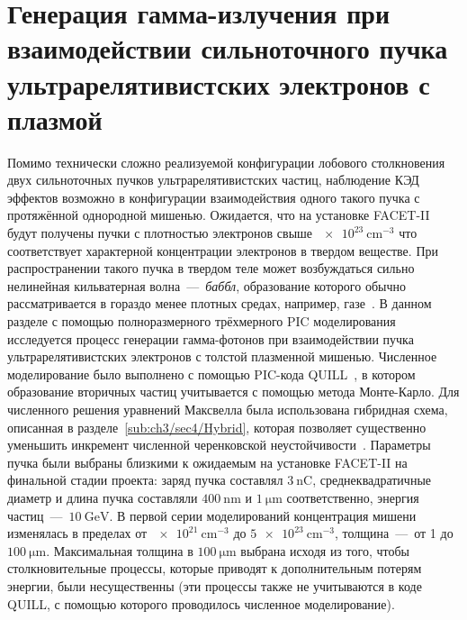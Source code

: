 \section{Генерация гамма-излучения при взаимодействии сильноточного пучка ультрарелятивистских электронов с плазмой}
\label{sec:ch3/sec5}

Помимо технически сложно реализуемой конфигурации лобового столкновения двух сильноточных пучков ультрарелятивистских частиц, наблюдение КЭД эффектов возможно в конфигурации взаимодействия одного такого пучка с протяжённой однородной мишенью. 
Ожидается, что на установке FACET-II будут получены пучки с плотностью электронов свыше $\SI{e23}{\centi\meter^{-3}}$ что соответствует характерной концентрации электронов в твердом веществе.
При распространении такого пучка в твердом теле может возбуждаться сильно нелинейная кильватерная волна~---~\textit{баббл}, образование которого обычно рассматривается в гораздо менее плотных средах, например, газе~\cite{rosenzweig1991acceleration, pukhov2002laser}.
В данном разделе с помощью полноразмерного трёхмерного PIC моделирования исследуется процесс генерации гамма-фотонов при взаимодействии пучка ультрарелятивистских электронов с толстой плазменной мишенью.
Численное моделирование было выполнено с помощью PIC-кода QUILL~\cite{QUILL}, в котором образование вторичных частиц учитывается с помощью метода Монте-Карло.
Для численного решения уравнений Максвелла была использована гибридная схема, описанная в разделе~\ref{sub:ch3/sec4/Hybrid}, которая позволяет существенно уменьшить инкремент численной черенковской неустойчивости~\cite{Birdsall1989, Meyers2014, Blinne2017}.
Параметры пучка были выбраны близкими к ожидаемым на установке FACET-II на финальной стадии проекта: заряд пучка составлял $\SI{3}{\nano\coulomb}$, среднеквадратичные диаметр и длина пучка составляли $\SI{400}{\nano\meter}$ и $\SI{1}{\um}$ соответственно, энергия частиц~---~$\SI{10}{\giga\electronvolt}$.
В первой серии моделирований концентрация мишени изменялась в пределах от $\SI{e21}{\centi\meter^{-3}}$ до $\SI{5e23}{\centi\meter^{-3}}$, толщина~---~от 1 до $\SI{100}{\um}$.
Максимальная толщина в $\SI{100}{\um}$ выбрана исходя из того, чтобы столкновительные процессы, которые приводят к дополнительным потерям энергии, были несущественны (эти процессы также не учитываются в коде QUILL, с помощью которого проводилось численное моделирование).

